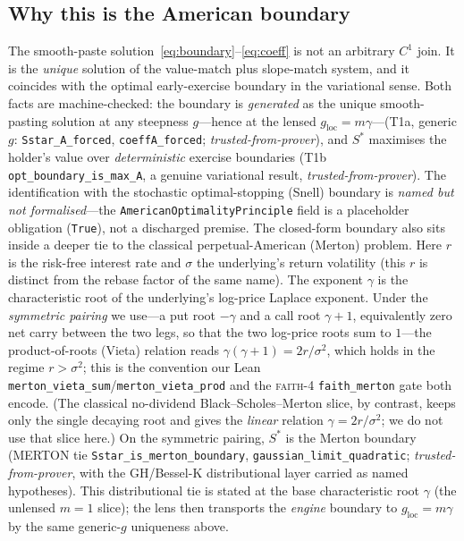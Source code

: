 \documentclass[11pt]{article}
\newcommand{\tfp}{\emph{trusted-from-prover}}
\begin{document}
\subsection{Why this is the American boundary}
The smooth-paste solution~\eqref{eq:boundary}--\eqref{eq:coeff} is not an
arbitrary $C^{1}$ join. It is the \emph{unique} solution of the value-match plus
slope-match system, and it coincides with the optimal early-exercise boundary in
the variational sense. Both facts are machine-checked: the boundary is
\emph{generated} as the unique smooth-pasting solution at any steepness $g$---hence
at the lensed $g_{\mathrm{loc}}=m\gamma$---(T1a, generic $g$:
\texttt{Sstar\_A\_forced}, \texttt{coeffA\_forced}; \tfp{}), and $S^{\ast}$
maximises the holder's value over \emph{deterministic} exercise boundaries (T1b
\texttt{opt\_boundary\_is\_max\_A}, a genuine variational result, \tfp{}). The
identification with the stochastic optimal-stopping (Snell) boundary is
\emph{named but not formalised}---the \texttt{AmericanOptimalityPrinciple} field
is a placeholder obligation (\texttt{True}), not a discharged premise. The closed-form boundary also sits inside a
deeper tie to the classical perpetual-American (Merton) problem. Here $r$ is the
risk-free interest rate and $\sigma$ the underlying's return volatility (this $r$
is distinct from the rebase factor of the same name). The exponent $\gamma$ is the
characteristic root of the underlying's log-price Laplace exponent. Under the
\emph{symmetric pairing} we use---a put root $-\gamma$ and a call root $\gamma+1$,
equivalently zero net carry between the two legs, so that the two log-price roots
sum to $1$---the product-of-roots (Vieta) relation reads
$\gamma(\gamma+1)=2r/\sigma^{2}$, which holds in the regime $r>\sigma^{2}$; this is
the convention our Lean \texttt{merton\_vieta\_sum}/\texttt{merton\_vieta\_prod}
and the \textsc{faith}-4 \texttt{faith\_merton} gate both encode. (The classical no-dividend
Black--Scholes--Merton slice, by contrast, keeps only the single decaying root and
gives the \emph{linear} relation $\gamma=2r/\sigma^{2}$; we do not use that slice
here.) On the symmetric pairing, $S^{\ast}$ is the Merton boundary (MERTON tie
\texttt{Sstar\_is\_merton\_boundary}, \texttt{gaussian\_limit\_quadratic};
\tfp{}, with the GH/Bessel-K distributional layer carried as named hypotheses).
This distributional tie is stated at the base characteristic root $\gamma$ (the
unlensed $m=1$ slice); the lens then transports the \emph{engine} boundary to
$g_{\mathrm{loc}}=m\gamma$ by the same generic-$g$ uniqueness above.
\end{document}
